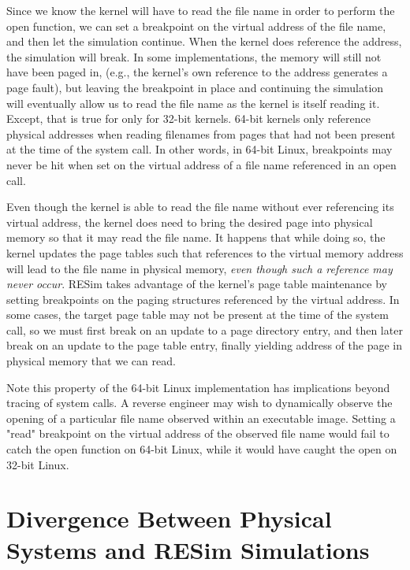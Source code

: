 \documentclass[titlepage]{article}
\begin{document}
\begin{appendices}
Since we know the kernel will have to read the file name in order to perform the open function, we
can set a breakpoint on the virtual address of the file name, and then let the simulation continue. 
When the kernel does reference the address, the simulation will break.  In some implementations, the
memory will still not have been paged in, (e.g., the kernel's own reference to the address generates a page fault),
but leaving the breakpoint in place and continuing the simulation
will eventually allow us to read the file name as the kernel is itself reading it.  Except, that is true for only 
for 32-bit kernels.  64-bit kernels only reference physical addresses when reading filenames from pages that had
not been present at the time of the system call.  In other words,
in 64-bit Linux, breakpoints may never be hit when set on the virtual address of a file name referenced in an open call.

Even though the kernel is able to read the file name without ever referencing its virtual address, the kernel does
need to bring the desired page into physical memory so that it may read the file name.  It happens that while doing so, the kernel
updates the page tables such that references to the virtual memory address will lead to the file name in
physical memory, \textit{even though such a reference may never occur}.  RESim takes advantage of the kernel's
page table maintenance by setting breakpoints on the paging structures referenced by the virtual address.
In some cases, the target page table may not be present at the time of the system call, so we must first
break on an update to a page directory entry, and then later break on an update to the page table entry,
finally yielding address of the page in physical memory that we can read.

Note this property of the 64-bit Linux implementation has implications beyond tracing of system calls.  A reverse
engineer may wish to dynamically observe the opening of a particular file name observed within an executable image.
Setting a "read" breakpoint on the virtual address of the observed file name would fail to catch the open function
on 64-bit Linux, while it would have caught the open on 32-bit Linux.



\section{Divergence Between Physical Systems and RESim Simulations}
\label{divergence}

\end{appendices}
\end{document}
